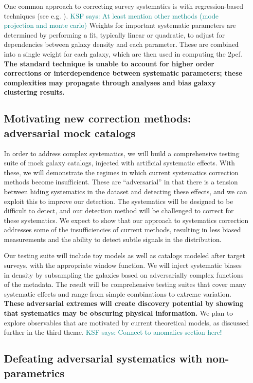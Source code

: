 \documentclass[12pt, fullpage, letterpaper]{article}
\newcommand{\KSF}[1]{\textcolor{teal}{KSF says: #1}}
\newcommand{\cf}{2pcf\xspace}
\begin{document}
One common approach to correcting survey systematics is with regression-based techniques (see e.g. \citealt{Ross2010}). \KSF{At least mention other methods (mode projection and monte carlo)}
Weights for important systematic parameters are determined by performing a fit, typically linear or quadratic, to adjust for dependencies between galaxy density and each parameter.
These are combined into a single weight for each galaxy, which are then used in computing the \cf.
\textbf{The standard technique is unable to account for higher order corrections or interdependence between systematic parameters; these complexities may propagate through analyses and bias galaxy clustering results.}

\subsection{Motivating new correction methods: adversarial mock catalogs}

In order to address complex systematics, we will build a comprehensive testing suite of mock galaxy catalogs, injected with artificial systematic effects.
With these, we will demonstrate the regimes in which current systematics correction methods become insufficient.
These are ``adversarial'' in that there is a tension between hiding systematics in the dataset and detecting these effects, and we can exploit this to improve our detection.
The systematics will be designed to be difficult to detect, and our detection method will be challenged to correct for these systematics. 
We expect to show that our approach to systematics correction addresses some of the insufficiencies of current methods, resulting in less biased measurements and the ability to detect subtle signals in the distribution.

Our testing suite will include toy models as well as catalogs modeled after target surveys, with the appropriate window function.
We will inject systematic biases in density by subsampling the galaxies based on adversarially complex functions of the metadata.
The result will be comprehensive testing suites that cover many systematic effects and range from simple combinations to extreme variation.
\textbf{These adversarial extremes will create discovery potential by showing that systematics may be obscuring physical information.}
We plan to explore observables that are motivated by current theoretical models, as discussed further in the third theme. \KSF{Connect to anomalies section here!}

\subsection{Defeating adversarial systematics with non-parametrics}
\end{document}
